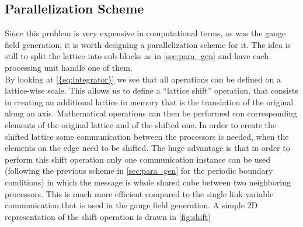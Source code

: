 \subsection{Parallelization Scheme}
\label{sec:shift}
Since this problem is very expensive in computational terms, as was the gauge field generation,  it is worth designing a parallelization scheme for it. The idea is still to split the lattice into sub-blocks as in \cref{sec:para_gen} and have each processing unit handle one of them.\\
By looking at \cref{{eq:integrator}} we see that all operations can be defined on a lattice-wise scale. This allows us to define a ``lattice shift'' operation, that consists in creating an additional lattice in memory that is the translation of the original along an axis. Mathematical operations can then be performed con corresponding elements of the original lattice and of the shifted one. 
In order to create the shifted lattice some communication between the processors is needed, when the elements on the edge need to be shifted. The huge advantage is that in order to perform this shift operation only one communication instance can be used (following the previous scheme in \cref{sec:para_gen} for the periodic boundary conditions) in which the message is whole shared cube between two neighboring processors. This is much more efficient compared to the single link variable communication that is used in the gauge field generation. A simple 2D representation of the shift operation is drawn in \cref{fig:shift}


